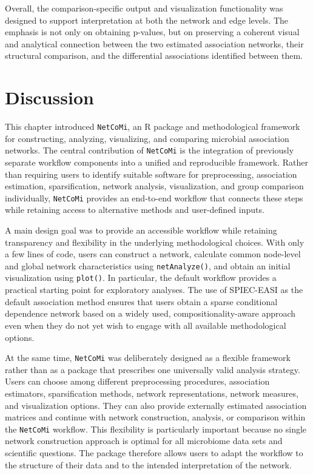Overall, the comparison-specific output and visualization functionality was designed to support interpretation at both the network and edge levels. The emphasis is not only on obtaining p-values, but on preserving a coherent visual and analytical connection between the two estimated association networks, their structural comparison, and the differential associations identified between them.

\section{Discussion}
\label{sec:5net:discussion}

This chapter introduced \texttt{NetCoMi}, an R package and methodological framework for constructing, analyzing, visualizing, and comparing microbial association networks. The central contribution of \texttt{NetCoMi} is the integration of previously separate workflow components into a unified and reproducible framework. Rather than requiring users to identify suitable software for preprocessing, association estimation, sparsification, network analysis, visualization, and group comparison individually, \texttt{NetCoMi} provides an end-to-end workflow that connects these steps while retaining access to alternative methods and user-defined inputs.

A main design goal was to provide an accessible workflow while retaining transparency and flexibility in the underlying methodological choices. With only a few lines of code, users can construct a network, calculate common node-level and global network characteristics using \texttt{netAnalyze()}, and obtain an initial visualization using \texttt{plot()}. In particular, the default workflow provides a practical starting point for exploratory analyses. The use of SPIEC-EASI as the default association method ensures that users obtain a sparse conditional dependence network based on a widely used, compositionality-aware approach even when they do not yet wish to engage with all available methodological options.

At the same time, \texttt{NetCoMi} was deliberately designed as a flexible framework rather than as a package that prescribes one universally valid analysis strategy. Users can choose among different preprocessing procedures, association estimators, sparsification methods, network representations, network measures, and visualization options. They can also provide externally estimated association matrices and continue with network construction, analysis, or comparison within the \texttt{NetCoMi} workflow. This flexibility is particularly important because no single network construction approach is optimal for all microbiome data sets and scientific questions. The package therefore allows users to adapt the workflow to the structure of their data and to the intended interpretation of the network.


